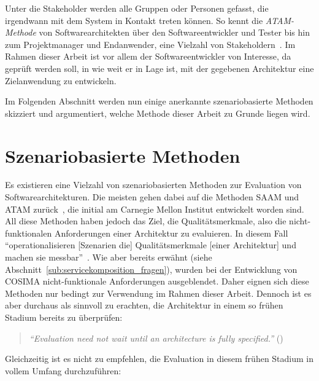  Unter die Stakeholder werden alle Gruppen oder Personen gefasst, die irgendwann mit dem System in Kontakt treten können. So kennt die \emph{ATAM-Methode} von Softwarearchitekten über den Softwareentwickler und Tester bis hin zum Projektmanager und Endanwender, eine Vielzahl von Stakeholdern~\citep[S. 63ff]{evaluating_software_architectures}. Im Rahmen dieser Arbeit ist vor allem der Softwareentwickler von Interesse, da geprüft werden soll, in wie weit er in Lage ist, mit der gegebenen Architektur eine Zielanwendung zu entwickeln.
  
  Im Folgenden Abschnitt werden nun einige anerkannte szenariobasierte Methoden skizziert und argumentiert, welche Methode dieser Arbeit zu Grunde liegen wird.

  
\section{Szenariobasierte Methoden} %
\label{sec:szenariobasierte_methoden}

  Es existieren eine Vielzahl von szenariobasierten Methoden zur Evaluation von Softwarearchitekturen. Die meisten gehen dabei auf die Methoden SAAM und ATAM zurück~\citep[S. 1]{scenario_based_software_architecture_evaluation_methods}, die initial am Carnegie Mellon Institut entwickelt worden sind. All diese Methoden haben jedoch das Ziel, die Qualitätsmerkmale, also die nicht-funktionalen Anforderungen einer Architektur zu evaluieren. In diesem Fall "`operationalisieren [Szenarien die] Qualitätsmerkmale [einer Architektur] und machen sie messbar"'~\citep[S. 61]{effektive_software_architekturen}. Wie aber bereits erwähnt (siehe Abschnitt~\ref{sub:servicekomposition_fragen}), wurden bei der Entwicklung von COSIMA nicht-funktionale Anforderungen ausgeblendet. Daher eignen sich diese Methoden nur bedingt zur Verwendung im Rahmen dieser Arbeit. Dennoch ist es aber durchaus als sinnvoll zu erachten, die Architektur in einem so frühen Stadium bereits zu überprüfen:
  
  \begin{quote}
    \emph{"`Evaluation need not wait until an architecture is fully specified."'} (\citep[S. 24]{evaluating_software_architectures})
  \end{quote}
  
  Gleichzeitig ist es nicht zu empfehlen, die Evaluation in diesem frühen Stadium in vollem Umfang durchzuführen:
  
